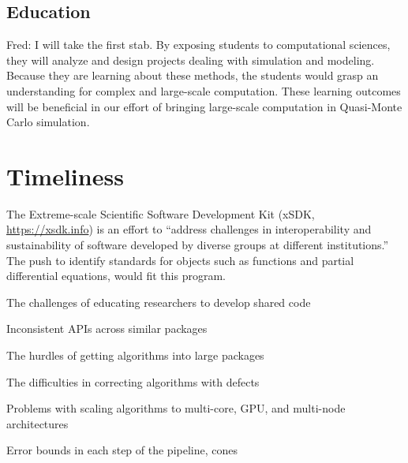 \documentclass{amsart}
\newcommand{\FJHNote}[1]{{\color{blue}Fred: #1}}
\begin{document}
\subsection{Education} \FJHNote{I will take the first stab.} %
By exposing students to computational sciences, they will analyze and design projects dealing with simulation and modeling. Because they are learning about these methods, the students would grasp an understanding for complex and large-scale computation. These learning outcomes will be beneficial in our effort of bringing large-scale computation in Quasi-Monte Carlo simulation.


\section{Timeliness} %

The Extreme-scale Scientific Software Development Kit (xSDK, \url{https://xsdk.info}) is an effort to ``address challenges in interoperability and sustainability of software developed by diverse groups at different institutions.'' The push to identify standards for objects such as functions and partial differential equations, would fit this program.

\printbibliography
%
%

The challenges of educating researchers to develop shared code

Inconsistent APIs across similar packages

The hurdles of getting algorithms into large packages

The difficulties in correcting algorithms with defects

Problems with scaling algorithms to multi-core, GPU, and multi-node architectures



Error bounds in each step of the pipeline, cones
\end{document}
